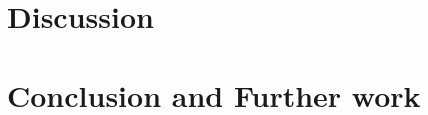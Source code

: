 \documentclass[conference,twocolumn,letterpaper,10pt]{latex/IEEEtran}
\begin{document}

\maketitle

\begin{abstract}

\end{abstract}

\begin{IEEEkeywords}
\end{IEEEkeywords}

\linenumbers





\section{Discussion}\label{sec:discussion}
\section{Conclusion and Further work}\label{sec:conclusion}
\nolinenumbers
\end{document}
